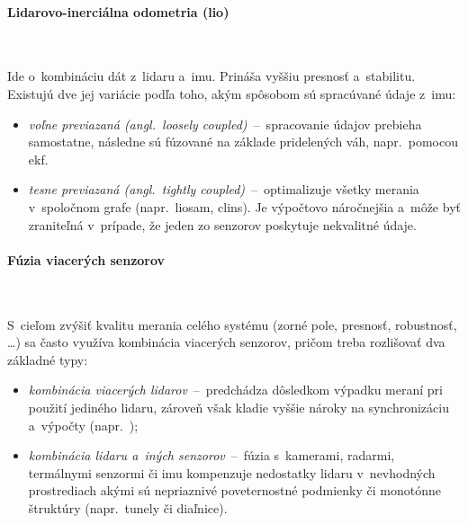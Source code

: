       \paragraph{Lidarovo-inerciálna odometria (\acrshort{lio})} \

        \noindent Ide o~kombináciu dát z~lidaru a~\acrshort{imu}. Prináša vyššiu presnosť a~stabilitu. Existujú dve jej variácie podľa toho, akým spôsobom sú spracúvané údaje z~\acrshort{imu}:
        \begin{itemize}
          \item \emph{voľne previazaná (angl.\ loosely coupled)}~--~spracovanie údajov prebieha samostatne, následne sú fúzované na základe pridelených váh, napr.\ pomocou \acrshort{ekf}.
          \item \emph{tesne previazaná (angl.\ tightly coupled)}~--~optimalizuje všetky merania v~spoločnom grafe (napr.\ \acrshort{liosam}, \acrshort{clins}). Je výpočtovo náročnejšia a~môže byť zraniteľná v~prípade, že jeden zo senzorov poskytuje nekvalitné údaje.
        \end{itemize}

      \paragraph{Fúzia viacerých senzorov} \

      \noindent S~cieľom zvýšiť kvalitu merania celého systému (zorné pole, presnosť, robustnosť, \dots) sa často využíva kombinácia viacerých senzorov, pričom treba rozlišovať dva základné typy:
      \begin{itemize}
        \item \emph{kombinácia viacerých lidarov}~--~predchádza dôsledkom výpadku meraní pri použití jediného lidaru, zároveň však kladie vyššie nároky na synchronizáciu a~výpočty (napr.\ );
        \item \emph{kombinácia lidaru a~iných senzorov}~--~fúzia s~kamerami, radarmi, termálnymi senzormi či \acrshort{imu} kompenzuje nedostatky lidaru v~nevhodných prostrediach akými sú nepriaznivé poveternostné podmienky či monotónne štruktúry (napr.\ tunely či diaľnice).
      \end{itemize}
      



